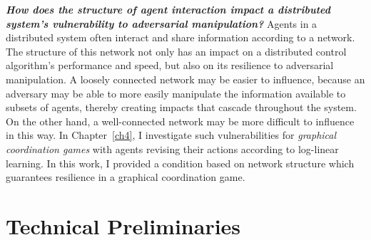 

\noindent\textbf{\emph{How does the structure of agent interaction impact a distributed system's vulnerability to adversarial manipulation?}}
Agents in a distributed system often interact and share information according to a network. The structure of this network not only has an impact on a distributed control algorithm's performance and speed, but also on its resilience to adversarial manipulation. A loosely connected network may be easier to influence, because an adversary may be able to more easily manipulate the information available to subsets of agents, thereby creating impacts that cascade throughout the system. On the other hand, a well-connected network may be more difficult to influence in this way. In Chapter~\ref{ch4}, I investigate such vulnerabilities for  \emph{graphical coordination games} \cite{Ullmann1977,Cooper1999} with agents revising their actions according to log-linear learning. In this work, I provided a condition based on network structure which guarantees resilience in a graphical coordination game. 





\section{Technical Preliminaries}

